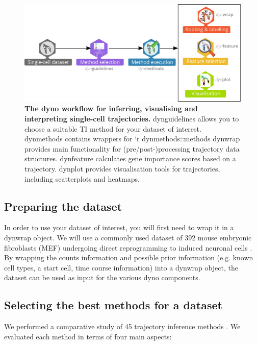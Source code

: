 \begin{figure}[htb!]
	\centering
	\includegraphics[width=.8\linewidth]{fig/toolkit.pdf}
	\caption{
		\textbf{The {dyno} workflow for inferring, visualising and interpreting single-cell trajectories.}
		{dynguidelines} allows you to choose a suitable TI method for your dataset of interest.
		{dynmethods} contains wrappers for `r dynmethods::methods %
		{dynwrap} provides main functionality for (pre/post-)processing trajectory data structures.
		{dynfeature} calculates gene importance scores based on a trajectory.
		{dynplot} provides visualisation tools for trajectories, including scatterplots and heatmaps.
	}
	\label{fig:dyno_toolkit}
\end{figure}

\subsection{Preparing the dataset}
In order to use your dataset of interest, you will first need to wrap it in a {dynwrap} object. We will use a commonly used dataset of 392 mouse embryonic fibroblasts (MEF) undergoing direct reprogramming to induced neuronal cells \cite{treutlein_dissectingdirectreprogramming_2016}. By wrapping the counts information and possible prior information (e.g. known cell types, a start cell, time course information) into a {dynwrap} object, the dataset can be used as input for the various {dyno} components.

\subsection{Selecting the best methods for a dataset}

We performed a comparative study of 45 trajectory inference
methods \cite{saelens_comparisonsinglecelltrajectory_2019}. We evaluated
each method in terms of four main aspects:

